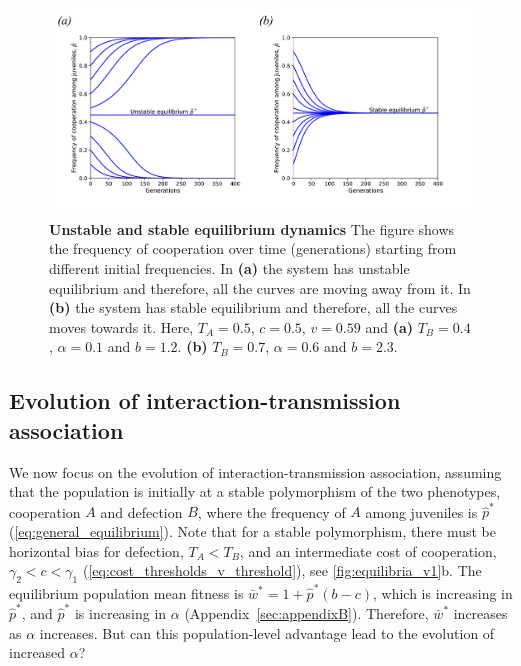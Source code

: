 \documentclass[12pt]{extarticle}
\begin{document}

\begin{figure}[h]
  \centering       
    \includegraphics[scale=0.5]{../PRSB_figures/fig_5.pdf}
    \caption{\textbf{Unstable and stable equilibrium dynamics} 
    The figure shows the frequency of cooperation over time (generations) starting from different initial frequencies.
    In \textbf{(a)} the system has unstable equilibrium and therefore, all the curves are moving away from it.
    In \textbf{(b)} the system has stable equilibrium and therefore, all the curves moves towards it. 
    Here, $T_A = 0.5$, $c = 0.5$,  $v=0.59$ and \textbf{(a)} $T_B = 0.4$, $\alpha=0.1$ and $b=1.2$. \textbf{(b)} $T_B=0.7$, $\alpha=0.6$ and $b=2.3$.}
    \label{fig:time_series}
\end{figure}

\subsection{Evolution of interaction-transmission association} 

We now focus on the evolution of interaction-transmission association, assuming that the population is initially at a stable polymorphism of the two phenotypes, cooperation $A$ and defection $B$, where the frequency of $A$ among juveniles is $\hat{p}^*$ (\autoref{eq:general_equilibrium}).
Note that for a stable polymorphism, there must be horizontal bias for defection, $T_A < T_B$, and an intermediate cost of cooperation, $\gamma_2 < c < \gamma_1$ (\autoref{eq:cost_thresholds_v_threshold}), see \autoref{fig:equilibria_v1}b.
The equilibrium population mean fitness is $\bar{w}^* = 1 + \hat{p}^*(b-c)$, which is increasing in $\hat{p}^*$, and $\hat{p}^*$ is increasing in $\alpha$ (Appendix~\ref{sec:appendixB}).
Therefore, $\bar{w}^*$ increases as $\alpha$ increases.
But can this population-level advantage lead to the evolution of increased $\alpha$? 
\end{document}
